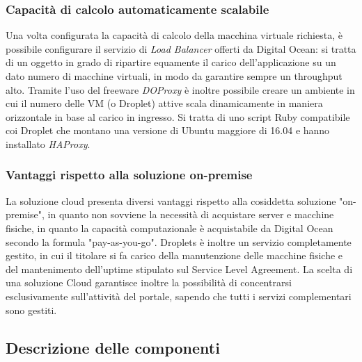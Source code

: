 \subsubsection{Capacità di calcolo automaticamente scalabile}
Una volta configurata la capacità di calcolo della macchina virtuale richiesta, è possibile configurare il servizio di \textit{Load Balancer} offerti da Digital Ocean: si tratta di un oggetto in grado di ripartire equamente il carico dell'applicazione su un dato numero di macchine virtuali, in modo da garantire sempre un throughput alto. Tramite l'uso del freeware \textit{DOProxy} è inoltre possibile creare un ambiente in cui il numero delle VM (o Droplet) attive scala dinamicamente in maniera orizzontale in base al carico in ingresso. Si tratta di uno script Ruby compatibile coi Droplet che montano una versione di Ubuntu maggiore di 16.04 e hanno installato \textit{HAProxy}. %
\subsubsection{Vantaggi rispetto alla soluzione on-premise}
La soluzione cloud presenta diversi vantaggi rispetto alla cosiddetta soluzione "on-premise", in quanto non sovviene la necessità di acquistare server e macchine fisiche, in quanto la capacità computazionale è acquistabile da Digital Ocean secondo la formula "pay-as-you-go". Droplets è inoltre un servizio completamente gestito, in cui il titolare si fa carico della manutenzione delle macchine fisiche e del mantenimento dell'uptime stipulato sul Service Level Agreement. La scelta di una soluzione Cloud garantisce inoltre la possibilità di concentrarsi esclusivamente sull'attività del portale, sapendo che tutti i servizi complementari sono gestiti. 
\subsection{Descrizione delle componenti}
